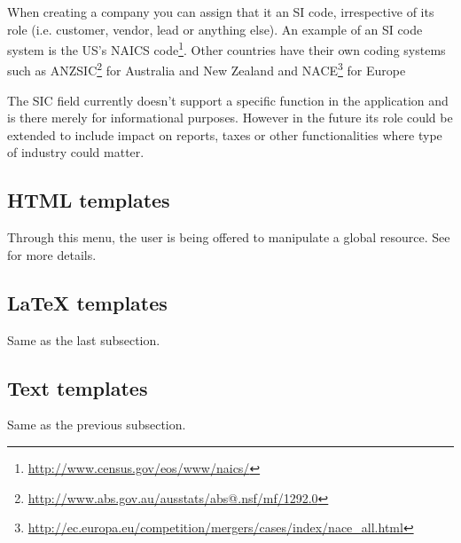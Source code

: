 When creating a company you can assign that it an SI code, irrespective of its role (i.e. customer,
vendor, lead or anything else). An example of an SI code system is the
US's NAICS code\footnote{\url{http://www.census.gov/eos/www/naics/}}.
Other countries have their own coding systems such
as ANZSIC\footnote{\url{http://www.abs.gov.au/ausstats/abs@.nsf/mf/1292.0}} for Australia and New Zealand
and NACE\footnote{\url{http://ec.europa.eu/competition/mergers/cases/index/nace\_all.html}} for Europe

The SIC field currently doesn't support a specific function in the application and is there
merely for informational purposes. However in the future its role could be extended to include
impact on reports, taxes or other functionalities where type of industry could matter.

\subsection{HTML templates}
\label{subsec-company-config-html-templates}

Through this menu, the user is being offered to manipulate a global resource. See
 for more details.

\subsection{LaTeX templates}
\label{subsec-company-config-latex-templates}

Same as the last subsection.

\subsection{Text templates}
\label{subsec-company-config-text-templates}

Same as the previous subsection.


